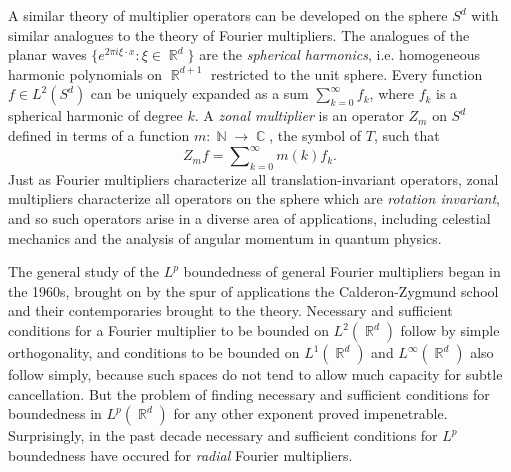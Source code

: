 \documentclass[12pt]{article}
\DeclareMathOperator{\RR}{\mathbb{R}}
\DeclareMathOperator{\NN}{\mathbb{N}}
\DeclareMathOperator{\CC}{\mathbb{C}}
\begin{document}
A similar theory of multiplier operators can be developed on the sphere $S^d$ with similar analogues to the theory of Fourier multipliers. The analogues of the planar waves $\{ e^{2 \pi i \xi \cdot x} : \xi \in \RR^d \}$ are the \emph{spherical harmonics}, i.e. homogeneous harmonic polynomials on $\RR^{d+1}$ restricted to the unit sphere. Every function $f \in L^2(S^d)$ can be uniquely expanded as a sum $\sum_{k = 0}^\infty f_k$, where $f_k$ is a spherical harmonic of degree $k$. A \emph{zonal multiplier} is an operator $Z_m$ on $S^d$ defined in terms of a function $m: \NN \to \CC$, the symbol of $T$, such that
%
\[ Z_m f = \sum\nolimits_{k = 0}^\infty m(k) f_k. \]
%
Just as Fourier multipliers characterize all translation-invariant operators, zonal multipliers characterize all operators on the sphere which are \emph{rotation invariant}, and so such operators arise in a diverse area of applications, including celestial mechanics and the analysis of angular momentum in quantum physics.

The general study of the $L^p$ boundedness of general Fourier multipliers began in the 1960s, brought on by the spur of applications the Calderon-Zygmund school and their contemporaries brought to the theory. Necessary and sufficient conditions for a Fourier multiplier to be bounded on $L^2(\RR^d)$ follow by simple orthogonality, and conditions to be bounded on $L^1(\RR^d)$ and $L^\infty(\RR^d)$ also follow simply, because such spaces do not tend to allow much capacity for subtle cancellation. But the problem of finding necessary and sufficient conditions for boundedness in $L^p(\RR^d)$ for any other exponent proved impenetrable. Surprisingly, in the past decade necessary and sufficient conditions for $L^p$ boundedness have occured for \emph{radial} Fourier multipliers.

\end{document}
